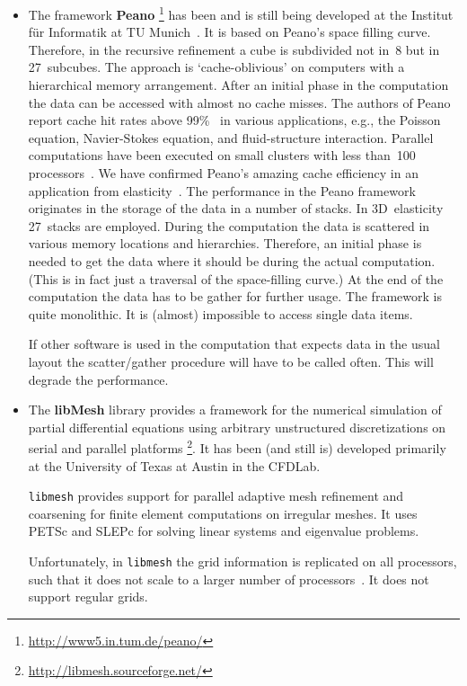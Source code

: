 \documentclass[11pt,pdftex]{article}
\begin{document}
\begin{itemize}
\item The framework \textbf{Peano}%
  \footnote{\url{http://www5.in.tum.de/peano/}}%
  has been and is still being developed at the Institut f\"ur Informatik
  at TU Munich~\cite{mmnw:09, bumw:06, hakz:08}.  It is based on Peano's
  space filling curve.  Therefore, in the recursive refinement a cube is
  subdivided not in~8 but in 27~subcubes.  The approach is
  `cache-oblivious' on computers with a hierarchical memory arrangement.
  After an initial phase in the computation the data can be accessed
  with almost no cache misses.  The authors of Peano report cache hit
  rates above 99\%~\cite{hakz:08} in various applications, e.g., the
  Poisson equation, Navier-Stokes equation, and fluid-structure
  interaction.  Parallel computations have been executed on small
  clusters with less than~100 processors~\cite{mmnw:09}.  We have
  confirmed Peano's amazing cache efficiency in an application from
  elasticity~\cite{sche:10}.  The performance in the Peano framework
  originates in the storage of the data in a number of stacks.  In
  3D~elasticity 27~stacks are employed.  During the computation the data
  is scattered in various memory locations and hierarchies.  Therefore,
  an initial phase is needed to get the data where it should be during
  the actual computation.  (This is in fact just a traversal of the
  space-filling curve.)  At the end of the computation the data has to
  be gather for further usage.  The framework is quite monolithic.  It
  is (almost) impossible to access single data items.

  If other software is used in the computation that expects data in the
  usual layout the scatter/gather procedure will have to be called
  often.  This will degrade the performance.

\item The \textbf{libMesh} library provides a framework for the
  numerical simulation of partial differential equations using arbitrary
  unstructured discretizations on serial and parallel platforms%
  \footnote{\url{http://libmesh.sourceforge.net/}}.  It has been (and
  still is) developed primarily at the University of Texas at Austin in
  the CFDLab.

  \texttt{libmesh} provides support for parallel adaptive mesh refinement
  and coarsening for finite element computations on irregular meshes.
  It uses PETSc and SLEPc for solving linear systems and eigenvalue
  problems.

  Unfortunately, in \texttt{libmesh} the grid information is replicated
  on all processors, such that it does not scale to a larger number of
  processors~\cite{kpsc:06}.  It does not support regular grids.


\end{itemize}
\end{document}
